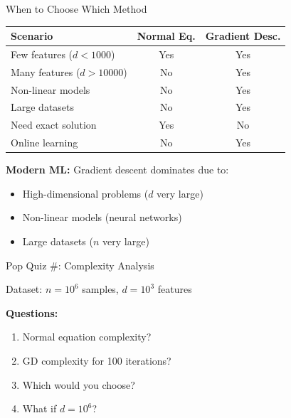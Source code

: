 \documentclass[usenames,dvipsnames]{beamer}
\begin{document}
  \begin{frame}{When to Choose Which Method}
    \begin{center}
    \begin{tabular}{|l|c|c|}
        \hline
        \textbf{Scenario} & \textbf{Normal Eq.} & \textbf{Gradient Desc.} \\
        \hline
        Few features ($d < 1000$) & Yes & Yes \\
        \hline
        Many features ($d > 10000$) & No & Yes \\
        \hline
        Non-linear models & No & Yes \\
        \hline
        Large datasets & No & Yes \\
        \hline
        Need exact solution & Yes & No \\
        \hline
        Online learning & No & Yes \\
        \hline
    \end{tabular}
    \end{center}
    
    \pause
    \begin{keypointsbox}
    \textbf{Modern ML:} Gradient descent dominates due to:
    \begin{itemize}
        \item High-dimensional problems ($d$ very large)
        \item Non-linear models (neural networks)
        \item Large datasets ($n$ very large)
    \end{itemize}
    \end{keypointsbox}
  \end{frame}

  \begin{frame}{Pop Quiz \#\thepopquiz: Complexity Analysis}
    \begin{popquizbox}{\thepopquiz}
    Dataset: $n = 10^6$ samples, $d = 10^3$ features
    
    \textbf{Questions:}
    \begin{enumerate}
        \item Normal equation complexity?
        \item GD complexity for 100 iterations?
        \item Which would you choose?
        \item What if $d = 10^6$?
    \end{enumerate}
    \end{popquizbox}
  \end{frame}
\end{document}
